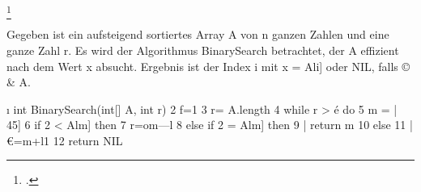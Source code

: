 \documentclass{lehramt-informatik-aufgabe}
\begin{document}
\footcite{examen:46115:2021:03}

Gegeben ist ein aufsteigend sortiertes Array A von n ganzen Zahlen und eine ganze Zahl r.
Es wird der Algorithmus BinarySearch betrachtet, der A effizient nach dem Wert x absucht.
Ergebnis ist der Index i mit x = Ali] oder NIL, falls © \& A.

ı int BinarySearch(int[] A, int r)
2 f=1
3 r= A.length
4 while r > é do
5 m = | 45]
6 if 2 < Alm] then
7 r=om—l
8 else if 2 = Alm] then
9 | return m
10 else
11 | €=m+l1
12 return NIL
\end{document}
